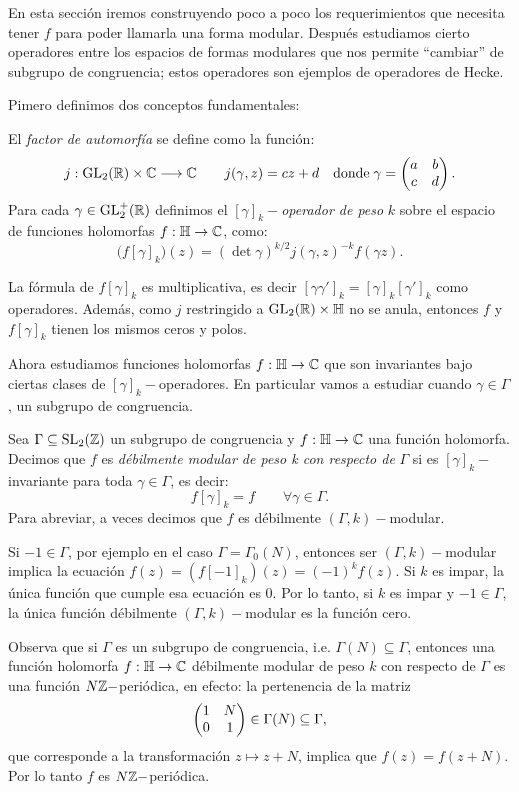 En esta secci\'on iremos construyendo poco a poco los requerimientos que necesita tener $f$ para
poder llamarla una forma modular. Despu\'es estudiamos cierto operadores entre los espacios de
formas modulares que nos permite ``cambiar'' de subgrupo de congruencia; estos operadores son
ejemplos de operadores de Hecke. 

Pimero definimos dos conceptos fundamentales:

\begin{defin}
  El \emph{factor de automorf\'ia} se define como la funci\'on:
  \[
    j:\mathrm{GL}_2(\mathbb{R})\times\mathbb{C}\longrightarrow\mathbb{C} \qquad j(\gamma,z)=cz+d\quad
    \mathrm{donde}\; \gamma=\begin{pmatrix}a & b\\ c & d\end{pmatrix}.
  \]
  Para cada $\gamma\in\mathrm{GL}_2^+(\mathbb{R})$ definimos el $[\gamma]_k-$\emph{operador de peso} $k$ sobre el
  espacio de funciones holomorfas $f:\mathbb{H}\rightarrow\mathbb{C}$, como:
  \[
    \big(f[\gamma]_k\big)(z)=(\det\gamma)^{k/2}j(\gamma,z)^{-k}f(\gamma z).
  \]
\end{defin}

\begin{notas}
  La f\'ormula de $f[\gamma]_k$ es multiplicativa, es decir
  $[\gamma\gamma']_k=[\gamma]_k[\gamma']_k$ como operadores. Adem\'as, como $j$ restringido a
  $\mathrm{GL}_2(\mathbb{R})\times\mathbb{H}$ no se anula, entonces $f$ y $f[\gamma]_k$ tienen los mismos ceros y polos.
\end{notas}

Ahora estudiamos funciones holomorfas $f:\mathbb{H}\rightarrow\mathbb{C}$ que son invariantes bajo ciertas clases de
$[\gamma]_k-$operadores. En particular vamos a estudiar cuando $\gamma\in\Gamma$, un subgrupo
de congruencia.

\begin{defin}
  Sea $\Gamma\subseteq\mathrm{SL}_2(\mathbb{Z})$ un subgrupo de congruencia y $f:\mathbb{H}\rightarrow\mathbb{C}$ una funci\'on
  holomorfa. Decimos que $f$ es \emph{d\'ebilmente modular de peso k con respecto de} $\Gamma$
  si es $[\gamma]_k-$invariante para toda $\gamma\in\Gamma$, es decir:
  \[
    f[\gamma]_k=f \qquad\forall\gamma\in\Gamma.
  \]
  Para abreviar, a veces decimos que $f$ es d\'ebilmente $(\Gamma,k)-$modular.
\end{defin}
\begin{nota}
  Si $-1\in\Gamma$, por ejemplo en el caso $\Gamma=\Gamma_0(N)$, entonces ser $(\Gamma,k)-$modular
  implica la ecuaci\'on $f(z)=(f[-1]_k)(z)=(-1)^kf(z)$. Si $k$ es impar, la \'unica funci\'on que
  cumple esa ecuaci\'on es $0$. Por lo tanto, si $k$ es impar y $-1\in\Gamma$, la \'unica
  funci\'on d\'ebilmente $(\Gamma,k)-$modular es la funci\'on cero.
\end{nota}
Observa que si $\Gamma$ es un subgrupo de congruencia, i.e. $\Gamma(N)\subseteq\Gamma$, entonces
una funci\'on holomorfa $f:\mathbb{H}\rightarrow\mathbb{C}$ d\'ebilmente modular de peso $k$ con respecto de $\Gamma$
es una funci\'on $N\mathbb{Z}-$peri\'odica, en efecto: la pertenencia de la matriz
\[
  \begin{pmatrix}1 & N\\ 0 & 1\end{pmatrix}\in\Gamma(N)\subseteq\Gamma,
\]
que corresponde a la transformaci\'on $z\mapsto z+N$, implica que $f(z)=f(z+N)$. Por lo tanto
$f$ es $N\mathbb{Z}-$peri\'odica.

